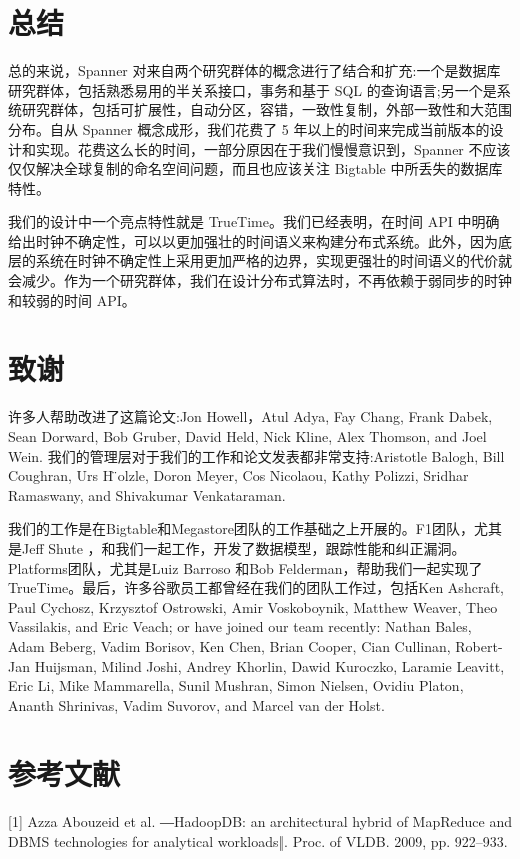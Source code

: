 \documentclass[letterpaper,twocolumn,10pt]{article}
\begin{document}
\section{总结}
总的来说，Spanner 对来自两个研究群体的概念进行了结合和扩充:一个是数据库研究群体，包括熟悉易用的半关系接口，事务和基于 SQL 的查询语言;另一个是系统研究群体，包括可扩展性，自动分区，容错，一致性复制，外部一致性和大范围分布。自从 Spanner 概念成形，我们花费了 5 年以上的时间来完成当前版本的设计和实现。花费这么长的时间，一部分原因在于我们慢慢意识到，Spanner 不应该仅仅解决全球复制的命名空间问题，而且也应该关注 Bigtable 中所丢失的数据库特性。

我们的设计中一个亮点特性就是 TrueTime。我们已经表明，在时间 API 中明确给出时钟不确定性，可以以更加强壮的时间语义来构建分布式系统。此外，因为底层的系统在时钟不确定性上采用更加严格的边界，实现更强壮的时间语义的代价就会减少。作为一个研究群体，我们在设计分布式算法时，不再依赖于弱同步的时钟和较弱的时间 API。

\section{致谢}
许多人帮助改进了这篇论文:Jon Howell，Atul Adya, Fay Chang, Frank Dabek, Sean Dorward, Bob Gruber, David Held, Nick Kline, Alex Thomson, and Joel Wein. 我们的管理层对于我们的工作和论文发表都非常支持:Aristotle Balogh, Bill Coughran, Urs H ̈olzle, Doron Meyer, Cos Nicolaou, Kathy Polizzi, Sridhar Ramaswany, and Shivakumar Venkataraman.

我们的工作是在Bigtable和Megastore团队的工作基础之上开展的。F1团队，尤其是Jeff Shute ，和我们一起工作，开发了数据模型，跟踪性能和纠正漏洞。Platforms团队，尤其是Luiz Barroso 和Bob Felderman，帮助我们一起实现了TrueTime。最后，许多谷歌员工都曾经在我们的团队工作过，包括Ken Ashcraft, Paul Cychosz, Krzysztof Ostrowski, Amir Voskoboynik, Matthew Weaver, Theo Vassilakis, and Eric Veach; or have joined our team recently: Nathan Bales, Adam Beberg, Vadim Borisov, Ken Chen, Brian Cooper, Cian Cullinan, Robert-Jan Huijsman, Milind Joshi, Andrey Khorlin, Dawid Kuroczko, Laramie Leavitt, Eric Li, Mike Mammarella, Sunil Mushran, Simon Nielsen, Ovidiu Platon, Ananth Shrinivas, Vadim Suvorov, and Marcel van der Holst.

\section{参考文献}
[1] Azza Abouzeid et al. ―HadoopDB: an architectural hybrid of MapReduce and DBMS technologies for analytical workloads‖. Proc. of VLDB. 2009, pp. 922–933. 
\end{document}
